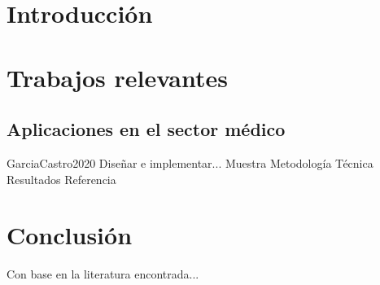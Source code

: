 \label{chap:state art}


\section{Introducción}\label{sec:art intro}

    \lipsum[17]

    \lipsum[18]
    
\section{Trabajos relevantes}\label{sec:art relevant research}

    \lipsum[17]

    \lipsum[17]

    \lipsum[17]

    \lipsum[17]
    
    \subsection*{Aplicaciones en el sector médico}

    \lipsum[17]

    \lipsum[17]

    \lipsum[17]

    \lipsum[17]
    
    \matrixstate
        {GarciaCastro2020} %
        {Diseñar e implementar...} %
        {Muestra} %
        {Metodología} %
        {Técnica} %
        {Resultados} %
        {Referencia} %
    
\section{Conclusión}\label{sec:art comments}
    
    Con base en la literatura encontrada...